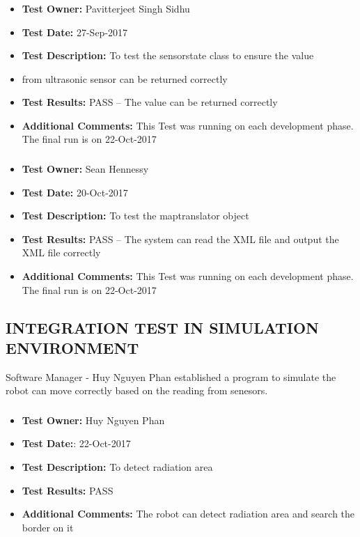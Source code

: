 \documentclass[10pt,a4paper,titlepage]{article}
\begin{document}
\subsubsection*{}
\begin{itemize}
\item \textbf{Test Owner:} Pavitterjeet Singh Sidhu
\item \textbf{Test Date:} 27-Sep-2017
\item \textbf{Test Description:} To test the sensorstate class to ensure the value \item from ultrasonic sensor can be returned correctly
\item \textbf{Test Results:} PASS – The value can be returned correctly
\item \textbf{Additional Comments:} This Test was running on each development phase. The final run is on 22-Oct-2017
\end{itemize}

\subsubsection*{}
\begin{itemize}
\item \textbf{Test Owner:} Sean Hennessy
\item \textbf{Test Date:} 20-Oct-2017
\item \textbf{Test Description:} To test the maptranslator object
\item \textbf{Test Results:} PASS – The system can read the XML file and output the XML file correctly  
\item \textbf{Additional Comments:} This Test was running on each development phase. The final run is on 22-Oct-2017
\end{itemize}


\subsection{INTEGRATION TEST IN SIMULATION ENVIRONMENT}
Software Manager - Huy Nguyen Phan established a program to simulate the robot can move correctly based on the reading from senesors.

\subsubsection*{}
\begin{itemize}
\item \textbf{Test Owner:}  Huy Nguyen Phan
\item \textbf{Test Date:}: 22-Oct-2017
\item \textbf{Test Description:} To detect radiation area 
\item \textbf{Test Results:} PASS
\item \textbf{Additional Comments:} The robot can detect radiation area and search the border on it
\end{itemize}
\end{document}
